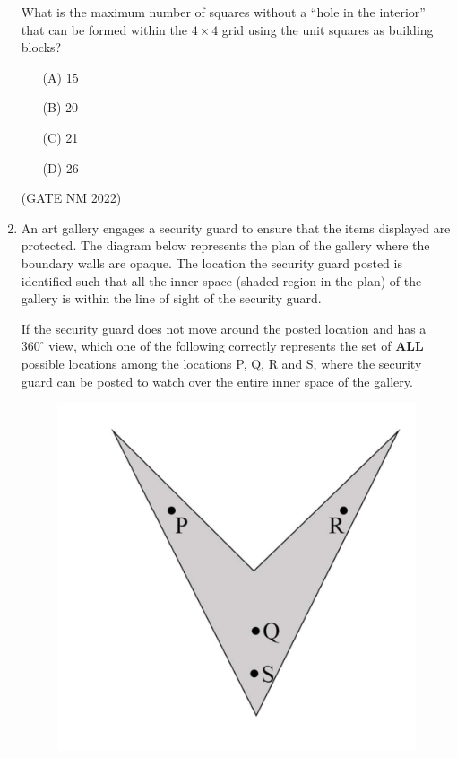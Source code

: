 \documentclass[journal,12pt,onecolumn]{IEEEtran}
\theoremstyle{remark}
\begin{document}
\begin{enumerate}
What is the maximum number of squares without a ``hole in the interior'' that can be formed within the $4 \times 4$ grid using the unit squares as building blocks?  

\medskip

\begin{multicols}{4}
  
\begin{enumerate}
	\item [(A)] 15
	\item [(B)] 20
	\item [(C)] 21
	\item [(D)] 26
\end{enumerate}

\end{multicols}


\hfill(GATE NM 2022)






\item  An art gallery engages a security guard to ensure that the items displayed are protected. The diagram below represents the plan of the gallery where the boundary walls are opaque. The location the security guard posted is identified such that all the inner space (shaded region in the plan) of the gallery is within the line of sight of the security guard.  

If the security guard does not move around the posted location and has a $360^\circ$ view, which one of the following correctly represents the set of \textbf{ALL} possible locations among the locations P, Q, R and S, where the security guard can be posted to watch over the entire inner space of the gallery.  

\begin{figure}[h]
	\centering
	\includegraphics[width=0.5\columnwidth]{fig2}
	\caption{}
	\label{fig:placeholder}
\end{figure}


\end{enumerate}
\end{document}
